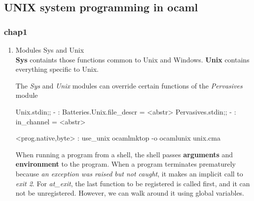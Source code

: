 \subsection{UNIX system programming in ocaml}
\label{sec:unix-syst-progr}

\subsubsection{chap1}
\label{sec:chap1}

\begin{enumerate}
\item Modules Sys and Unix \\
  \textbf{Sys} containts those functions common to Unix and Windows.
  \textbf{Unix} contains everything specific to Unix.

  The \textit{Sys} and \textit{Unix} modules can override certain
  functions of the \textit{Pervasives} module
  \begin{alternate}
Unix.stdin;;
- : Batteries.Unix.file_descr = <abstr>
Pervasives.stdin;;
- : in_channel = <abstr>
\end{alternate}

\begin{bluecode}
  <prog.{native,byte}> : use_unix
  ocamlmktop -o ocamlunix unix.cma
\end{bluecode}

When running a program from a shell, the shell passes \textbf{arguments} and
\textbf{environment} to the program. When a program terminates
prematurely because \textit{an exception was raised but not caught}, it makes
an implicit call to \textit{exit 2}. For \textit{at\_exit}, the last
function to be registered is called first, and it can not be
unregistered. However, we can walk around it using global variables.


\end{enumerate}
